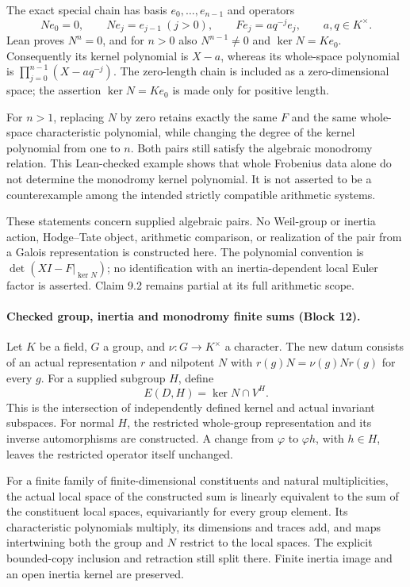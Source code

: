 \documentclass[11pt]{article}
\theoremstyle{definition}
\theoremstyle{remark}
\begin{document}
The exact special chain has basis $e_0,\ldots,e_{n-1}$ and operators
\[
 Ne_0=0,\qquad Ne_j=e_{j-1}\ (j>0),\qquad Fe_j=aq^{-j}e_j,
 \qquad a,q\in K^\times.
\]
Lean proves $N^n=0$, and for $n>0$ also $N^{n-1}\ne0$ and
$\ker N=Ke_0$. Consequently its kernel polynomial is $X-a$, whereas its
whole-space polynomial is $\prod_{j=0}^{n-1}(X-aq^{-j})$.
The zero-length chain is included as a zero-dimensional space; the assertion
$\ker N=Ke_0$ is made only for positive length.

For $n>1$, replacing $N$ by zero retains exactly the same $F$ and the same
whole-space characteristic polynomial, while changing the degree of the kernel
polynomial from one to $n$. Both pairs still satisfy the algebraic monodromy
relation. This Lean-checked example shows that whole Frobenius data alone do
not determine the monodromy kernel polynomial. It is not asserted to be a
counterexample among the intended strictly compatible arithmetic systems.

These statements concern supplied algebraic pairs. No Weil-group or inertia
action, Hodge--Tate object, arithmetic comparison, or realization of the pair
from a Galois representation is constructed here. The polynomial convention is
$\det(XI-F|_{\ker N})$; no identification with an inertia-dependent local
Euler factor is asserted. Claim 9.2 remains partial at its full arithmetic scope.


\paragraph{Checked group, inertia and monodromy finite sums (Block 12).}
Let $K$ be a field, $G$ a group, and $\nu:G\to K^\times$ a character.
The new datum consists of an actual representation $r$ and nilpotent $N$ with
$r(g)N=\nu(g)Nr(g)$ for every $g$. For a supplied subgroup $H$, define
\[
 E(D,H)=\ker N\cap V^H.
\]
This is the intersection of independently defined kernel and actual invariant
subspaces. For normal $H$, the restricted whole-group representation and its
inverse automorphisms are constructed. A change from $\varphi$ to $\varphi h$,
with $h\in H$, leaves the restricted operator itself unchanged.

For a finite family of finite-dimensional constituents and natural multiplicities,
the actual local space of the constructed sum is linearly equivalent to the sum of the constituent local spaces, equivariantly
for every group element. Its characteristic polynomials multiply, its dimensions
and traces add, and maps intertwining both the group and $N$ restrict to the
local spaces. The explicit bounded-copy inclusion and retraction still split
there. Finite inertia image and an open inertia kernel are preserved.
\end{document}
